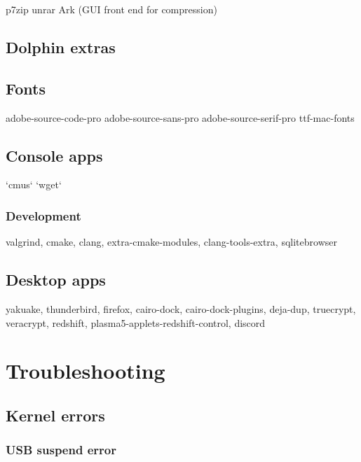 p7zip
unrar
Ark (GUI front end for compression)

\subsection{Dolphin extras}


\subsection{Fonts}

adobe-source-code-pro
adobe-source-sans-pro
adobe-source-serif-pro
ttf-mac-fonts

\subsection{Console apps}

`cmus`
`wget`

\subsubsection{Development}

valgrind, cmake, clang, extra-cmake-modules, clang-tools-extra, 
sqlitebrowser

\subsection{Desktop apps}

yakuake, thunderbird, firefox, cairo-dock, cairo-dock-plugins, 
deja-dup, truecrypt, veracrypt, 
redshift, plasma5-applets-redshift-control, 
discord

\clearpage
\section{Troubleshooting}

\subsection{Kernel errors}
\subsubsection{USB suspend error}

